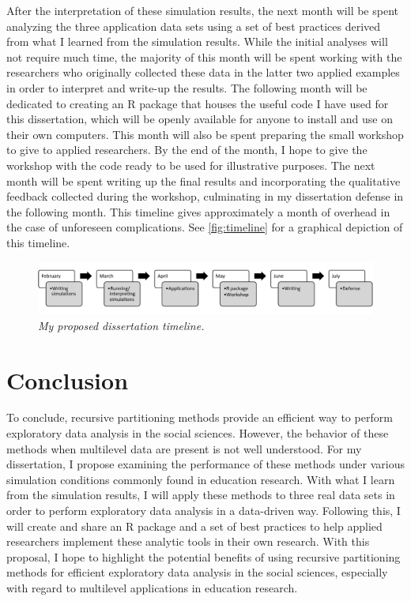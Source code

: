 	After the interpretation of these simulation results, the next month will be spent analyzing the three application data sets using a set of best practices derived from what I learned from the simulation results. While the initial analyses will not require much time, the majority of this month will be spent working with the researchers who originally collected these data in the latter two applied examples in order to interpret and write-up the results. The following month will be dedicated to creating an R package that houses the useful code I have used for this dissertation, which will be openly available for anyone to install and use on their own computers. This month will also be spent preparing the small workshop to give to applied researchers. By the end of the month, I hope to give the workshop with the code ready to be used for illustrative purposes. The next month will be spent writing up the final results and incorporating the qualitative feedback collected during the workshop, culminating in my dissertation defense in the following month. This timeline gives approximately a month of overhead in the case of unforeseen complications. See \autoref{fig:timeline} for a graphical depiction of this timeline.

\begin{figure}[hb]
  \centering
  \includegraphics[width=4.5in]{Figures/Chapter05/timeline.pdf}
  \caption[My proposed dissertation timeline.]{\textit{My proposed dissertation timeline.}}
  \label{fig:timeline}
\end{figure}


\section{Conclusion}

	To conclude, recursive partitioning methods provide an efficient way to perform exploratory data analysis in the social sciences. However, the behavior of these methods when multilevel data are present is not well understood. For my dissertation, I propose examining the performance of these methods under various simulation conditions commonly found in education research. With what I learn from the simulation results, I will apply these methods to three real data sets in order to perform exploratory data analysis in a data-driven way. Following this, I will create and share an R package and a set of best practices to help applied researchers implement these analytic tools in their own research. With this proposal, I hope to highlight the potential benefits of using recursive partitioning methods for efficient exploratory data analysis in the social sciences, especially with regard to multilevel applications in education research. 

